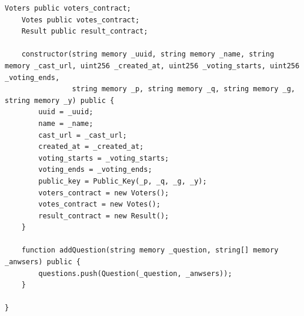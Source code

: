 \documentclass{ufsctex/ufsctex}
\begin{document}
\begin{lstlisting}[language=Solidity]
    Voters public voters_contract;
    Votes public votes_contract;
    Result public result_contract;
    
    constructor(string memory _uuid, string memory _name, string memory _cast_url, uint256 _created_at, uint256 _voting_starts, uint256 _voting_ends,
                string memory _p, string memory _q, string memory _g, string memory _y) public {
        uuid = _uuid;
        name = _name;
        cast_url = _cast_url;
        created_at = _created_at;
        voting_starts = _voting_starts;
        voting_ends = _voting_ends;
        public_key = Public_Key(_p, _q, _g, _y);
        voters_contract = new Voters();
        votes_contract = new Votes();
        result_contract = new Result();
    }
    
    function addQuestion(string memory _question, string[] memory _anwsers) public {
        questions.push(Question(_question, _anwsers));
    }
    
}

\end{lstlisting}



\end{document}
